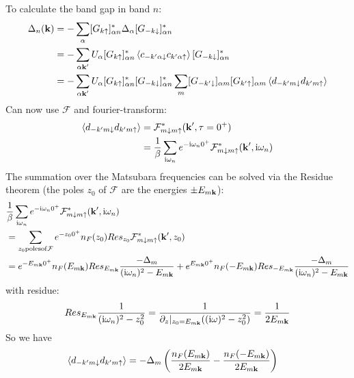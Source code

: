 To calculate the band gap in band \(n\):
\begin{align}
    \Delta_n (\bm{\mathrm{k}}) &= -\sum_{\alpha} [G_{k \uparrow}]_{\alpha n}^* \Delta_{\alpha} [G_{-k \downarrow}]_{\alpha n}^* \\
    &= -\sum_{\alpha \bm{\mathrm{k}}^{\prime}} U_{\alpha} [G_{k \uparrow}]_{\alpha n}^* \braket{c_{-k^{\prime} \alpha \downarrow} c_{k^{\prime} \alpha \uparrow}} [G_{-k \downarrow}]_{\alpha n}^* \\
    &= -\sum_{\alpha \bm{\mathrm{k}}^{\prime}} U_{\alpha} [G_{k \uparrow}]_{\alpha n}^* [G_{-k \downarrow}]_{\alpha n}^* \sum_{m} [G_{-k^{\prime} \downarrow}]_{\alpha m} [G_{k^{\prime} \uparrow}]_{\alpha m} \braket{d_{-k^{\prime} m \downarrow} d_{k^{\prime} m \uparrow}}
\end{align}
Can now use \(\mathcal{F}\) and fourier-transform:
\begin{align}
    \braket{d_{-k^{\prime} m \downarrow} d_{k^{\prime} m \uparrow}} &= \mathcal{F}_{m \downarrow m \uparrow}^* (\bm{\mathrm{k}}^{\prime}, \tau = 0^+) \\
    &= \frac{1}{\beta} \sum_{\mathrm{i} \omega_n} e^{-\mathrm{i} \omega_n 0^+} \mathcal{F}_{m \downarrow m \uparrow}^* (\bm{\mathrm{k}}^{\prime}, \mathrm{i} \omega_n)
\end{align}
The summation over the Matsubara frequencies can be solved via the Residue theorem (the poles \(z_0\) of \(\mathcal{F}\) are the energies \(\pm E_{m \bm{\mathrm{k}}}\)):
\begin{align}
    &\frac{1}{\beta} \sum_{\mathrm{i} \omega_n} e^{-\mathrm{i} \omega_n 0^+} \mathcal{F}_{m \downarrow m \uparrow}^* (\bm{\mathrm{k}}^{\prime}, \mathrm{i} \omega_n) \\
    &= \sum_{z_0 \mathrm{poles of} \mathcal{F}} e^{-z_0 0^+} n_{F} (z_0) Res_{z_0} \mathcal{F}_{m \downarrow m \uparrow}^*  (\bm{\mathrm{k}}^{\prime}, z_0) \\
    &= e^{-E_{m \bm{\mathrm{k}}} 0^+} n_{F} (E_{m \bm{\mathrm{k}}}) Res_{E_{m \bm{\mathrm{k}}}} \frac{-\Delta_{m}}{(\mathrm{i} \omega_n)^2 - E_{m \bm{\mathrm{k}}}}
    + e^{E_{m \bm{\mathrm{k}}} 0^+} n_{F} (-E_{m \bm{\mathrm{k}}}) Res_{-E_{m \bm{\mathrm{k}}}} \frac{-\Delta_{m}}{(\mathrm{i} \omega_n)^2 - E_{m \bm{\mathrm{k}}}}
\end{align}
with residue:
\begin{equation}
    Res_{E_{m \vb{k}}} \frac{1}{(\iu \omega_n)^2 - z_0^2} = \frac{1}{\pdif{z}\vert_{z_0 = E_{m \vb{k}}} ((\iu \omega)^2 - z_0^2)} = \frac{1}{2 E_{m \vb{k}}}
\end{equation}
So we have
\begin{align}
    \braket{d_{-k^{\prime} m \downarrow} d_{k^{\prime} m \uparrow}} &= -\Delta_m \left(\frac{n_F (E_{m \bm{\mathrm{k}}})}{2 E_{m \bm{\mathrm{k}}}} - \frac{n_F (-E_{m \bm{\mathrm{k}}})}{2 E_{m \bm{\mathrm{k}}}}\right)
\end{align}
